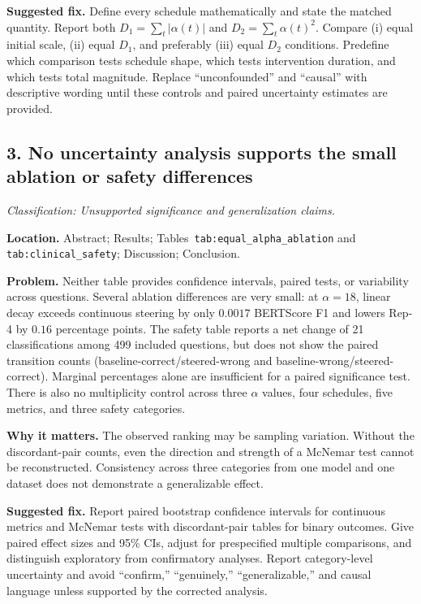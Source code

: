 \documentclass[11pt]{article}
\newcommand{\findinglabel}[1]{\textbf{#1}}
\newcommand{\classification}[1]{\textit{Classification: #1.}}
\begin{document}
\findinglabel{Suggested fix.} Define every schedule mathematically and state the matched quantity.  Report both $D_1=\sum_t|\alpha(t)|$ and $D_2=\sum_t\alpha(t)^2$.  Compare (i) equal initial scale, (ii) equal $D_1$, and preferably (iii) equal $D_2$ conditions.  Predefine which comparison tests schedule shape, which tests intervention duration, and which tests total magnitude.  Replace ``unconfounded'' and ``causal'' with descriptive wording until these controls and paired uncertainty estimates are provided.

\subsection*{3. No uncertainty analysis supports the small ablation or safety differences}

\classification{Unsupported significance and generalization claims}

\findinglabel{Location.} Abstract; Results; Tables~\texttt{tab:equal\_alpha\_ablation} and \texttt{tab:clinical\_safety}; Discussion; Conclusion.

\findinglabel{Problem.} Neither table provides confidence intervals, paired tests, or variability across questions.  Several ablation differences are very small: at $\alpha=18$, linear decay exceeds continuous steering by only $0.0017$ BERTScore F1 and lowers Rep-4 by $0.16$ percentage points.  The safety table reports a net change of 21 classifications among 499 included questions, but does not show the paired transition counts (baseline-correct/steered-wrong and baseline-wrong/steered-correct).  Marginal percentages alone are insufficient for a paired significance test.  There is also no multiplicity control across three $\alpha$ values, four schedules, five metrics, and three safety categories.

\findinglabel{Why it matters.} The observed ranking may be sampling variation.  Without the discordant-pair counts, even the direction and strength of a McNemar test cannot be reconstructed.  Consistency across three categories from one model and one dataset does not demonstrate a generalizable effect.

\findinglabel{Suggested fix.} Report paired bootstrap confidence intervals for continuous metrics and McNemar tests with discordant-pair tables for binary outcomes.  Give paired effect sizes and 95\% CIs, adjust for prespecified multiple comparisons, and distinguish exploratory from confirmatory analyses.  Report category-level uncertainty and avoid ``confirm,'' ``genuinely,'' ``generalizable,'' and causal language unless supported by the corrected analysis.
\end{document}
